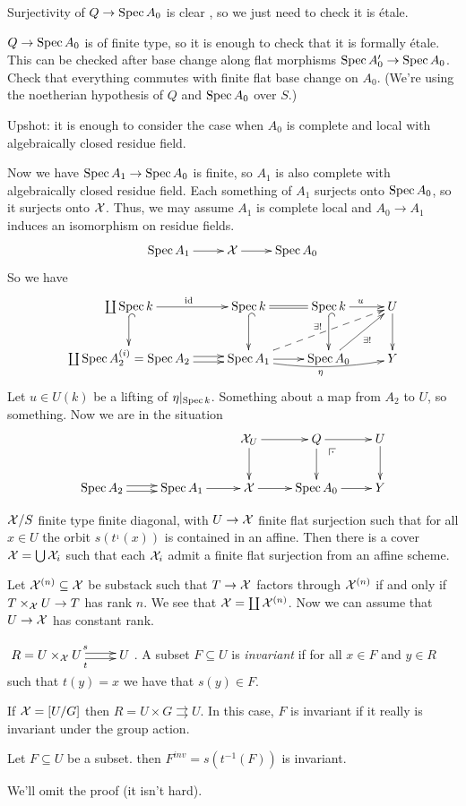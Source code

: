 Surjectivity of $Q\to \operatorname{Spec} A_0$ is clear \anton{}, so we just need
to check it is \'etale.

$Q\to \operatorname{Spec} A_0$ is of finite type, so it is enough to check that it
is formally \'etale. This can be checked after base change along flat
morphisms $\operatorname{Spec} A_0'\to \operatorname{Spec} A_0$. Check that everything commutes
with finite flat base change on $A_0$. (We're using the noetherian
hypothesis of $Q$ and $\operatorname{Spec} A_0$ over $S$.)

Upshot: it is enough to consider the case when $A_0$ is complete and
local with algebraically closed residue field.

Now we have $\operatorname{Spec} A_1\to \operatorname{Spec} A_0$ is finite, so $A_1$ is also
complete with algebraically closed residue field. Each something of
$A_1$ surjects onto $\operatorname{Spec} A_0$, so it surjects onto $\mathcal{X}$. Thus, we
may assume $A_1$ is complete local and $A_0\to A_1$ induces an
isomorphism on residue fields.
\[\xymatrix{
 \spec A_1\ar[r] & \X\ar[r] & \spec A_0
}\]
So we have
\[\xymatrix{
  \coprod \spec k \ar[r]^\id\ar@{^(->}[d]& \spec k
\ar@{=}[r]\ar@{^(->}[d] & \spec k\ar@{^(->}[d] \ar[r]^u & U\ar[d]\\
  \coprod \spec A_2^{(i)}=\spec A_2 \ar@<.5ex>[r]\ar@<-.5ex>[r]&
\spec A_1\ar[r] \ar@/_/[rr]_\eta \ar@{-->}[rru]^{\exists !} & \spec
A_0 \ar[ur]_{\exists!} & Y
}\]
Let $u\in U(k)$ be a lifting of $\eta|_{\operatorname{Spec} k}$. Something about a
map from $A_2$ to $U$, so something. Now we are in the situation
\[\xymatrix{
  & & \X_U \ar[d]\ar[r] & Q\ar[d]\ar[r]\ar@{}[dr]|(.25)\pb & U\ar[d]\\
  \spec A_2\ar@<.5ex>[r]\ar@<-.5ex>[r] & \spec A_1\ar[r]& \X\ar[r] &
\spec A_0\ar[r] & Y
}\]
\begin{theorem}
  $\mathcal{X}/S$ finite type finite diagonal, with $U\to \mathcal{X}$ finite flat
surjection such that for all $x\in U$ the orbit $s(t^{_1}(x))$ is
contained in an affine. Then there is a cover $\mathcal{X}=\bigcup \mathcal{X}_i$ such
that each $\mathcal{X}_i$ admit a finite flat surjection from an affine scheme.
\end{theorem}
Let $\mathcal{X}^{(n)}\subseteq \mathcal{X}$ be substack such that $T\to \mathcal{X}$ factors
through $\mathcal{X}^{(n)}$ if and only if $T\times_{\mathcal{X}} U\to T$ has rank $n$.
We see that $\mathcal{X}=\coprod \mathcal{X}^{(n)}$. Now we can assume that $U\to \mathcal{X}$
has constant rank.

$\xymatrix{R=U\times_\X U \ar@<.5ex>[r]^s\ar@<-.5ex>[r]_t & U}$. A
subset $F\subseteq U$ is \emph{invariant} if for all $x\in F$ and
$y\in R$ such that $t(y)=x$ we have that $s(y)\in F$.
\begin{example}
  If $\mathcal{X}=[U/G]$ then $R=U\times G\rightrightarrows U$. In this case,
$F$ is invariant if it really is invariant under the group action.
\end{example}
\begin{lemma}
  Let $F\subseteq U$ be a subset. then $F^{inv}=s(t^{-1}(F))$ is
invariant.
\end{lemma}
We'll omit the proof (it isn't hard).

